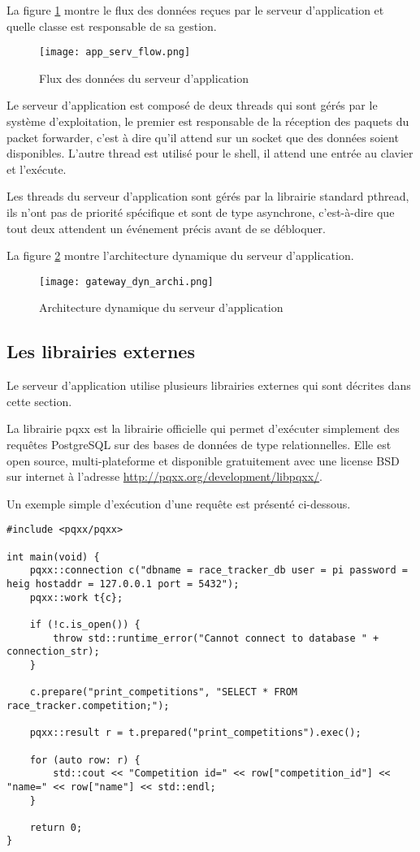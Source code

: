 La figure \ref{fig:app_serv_flow} montre le flux des données reçues par le serveur d'application et quelle classe est responsable de sa gestion.

\begin{figure}[htb]
\centering 
\texttt{[image: app\_serv\_flow.png]} 
\caption{Flux des données du serveur d'application}
\label{fig:app_serv_flow}
\end{figure}

Le serveur d'application est composé de deux threads qui sont gérés par le système d'exploitation, le premier est responsable de la réception des paquets du packet forwarder, c'est à dire qu'il attend sur un socket que des données soient disponibles. L'autre thread est utilisé pour le shell, il attend une entrée au clavier et l'exécute.

Les threads du serveur d'application sont gérés par la librairie standard pthread, ils n'ont pas de priorité spécifique et sont de type asynchrone, c'est-à-dire que tout deux attendent un événement précis avant de se débloquer.

La figure \ref{fig:gateway_dyn_archi} montre l'architecture dynamique du serveur d'application. 

\begin{figure}[htb]
\centering 
\texttt{[image: gateway\_dyn\_archi.png]} 
\caption{Architecture dynamique du serveur d'application}
\label{fig:gateway_dyn_archi}
\end{figure}

\subsection{Les librairies externes}

Le serveur d'application utilise plusieurs librairies externes qui sont décrites dans cette section.

La librairie pqxx est la librairie officielle qui permet d'exécuter simplement des requêtes PostgreSQL sur des bases de données de type relationnelles. Elle est open source, multi-plateforme et disponible gratuitement avec une license BSD sur internet à l'adresse \url{http://pqxx.org/development/libpqxx/}.

Un exemple simple d'exécution d'une requête est présenté ci-dessous.

\begin{lstlisting}[style=CStyle]
#include <pqxx/pqxx>

int main(void) {
	pqxx::connection c("dbname = race_tracker_db user = pi password = heig hostaddr = 127.0.0.1 port = 5432");
	pqxx::work t{c};

	if (!c.is_open()) {
		throw std::runtime_error("Cannot connect to database " + connection_str);
	}

	c.prepare("print_competitions", "SELECT * FROM race_tracker.competition;");

	pqxx::result r = t.prepared("print_competitions").exec();
	
	for (auto row: r) {
		std::cout << "Competition id=" << row["competition_id"] << "name=" << row["name"] << std::endl;
	}

	return 0;
}
\end{lstlisting}

